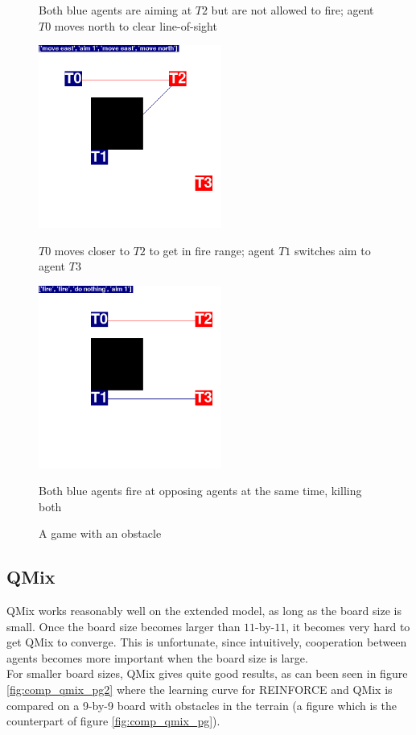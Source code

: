 \begin{figure}
\begin{minipage}{.45\textwidth}
  \caption*{Both blue agents are aiming at $T2$ but are not allowed to fire; agent $T0$ moves north to clear line-of-sight}
\end{minipage}%
\begin{minipage}{.1\textwidth}
\centering
  \caption*{ }
\end{minipage}%
\begin{minipage}{.45\textwidth}
  \centering
  \includegraphics[width=6cm]{images/iteration/screenshot04.png}
    \caption*{$T0$ moves closer to $T2$ to get in fire range; agent $T1$ switches aim to agent $T3$}
\end{minipage}
\begin{minipage}{.5\textwidth}
  \centering
  \includegraphics[width=6cm]{images/iteration/screenshot05.png}
    \caption*{Both blue agents fire at opposing agents at the same time, killing both}
\end{minipage}%
\begin{minipage}{.5\textwidth}
  \centering
\end{minipage}
\caption{A game with an obstacle}
\label{fig:simple_tactic02}
\end{figure}

\subsection{QMix}
QMix works reasonably well on the extended model, as long as the board size is small. Once the board size becomes larger than $11$-by-$11$, it becomes very hard to get QMix to converge. This is unfortunate, since intuitively, cooperation between agents becomes more important when the board size is large.\\
For smaller board sizes, QMix gives quite good results, as can been seen in figure \ref{fig:comp_qmix_pg2} where the learning curve for REINFORCE and QMix is compared on a 9-by-9 board with obstacles in the terrain (a figure which is the counterpart of figure \ref{fig:comp_qmix_pg}).


